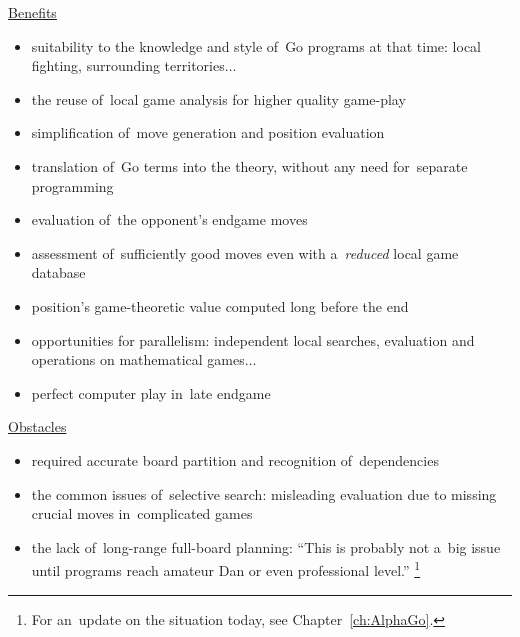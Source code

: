 \underline{Benefits}
\begin{itemize}[+]
  \item suitability to the knowledge and style of~Go programs at that time:
    local fighting, surrounding territories$\dots$
  \item the reuse of~local game analysis for higher quality game-play
  \item simplification of~move generation and position evaluation
  \item translation of~Go terms into the theory, without any need for~separate programming
  \item evaluation of~the opponent's endgame moves
  \item assessment of~sufficiently good moves even with a~\emph{reduced} local game database
  \item position's game-theoretic value computed long before the end
  \item opportunities for parallelism:
    independent local searches, evaluation and operations on mathematical games$\dots$
  \item perfect computer play in~late endgame
\end{itemize}

\underline{Obstacles}
\begin{itemize}[-]
  \item required accurate board partition and recognition of~dependencies
  \item the common issues of~selective search:
    misleading evaluation due to missing crucial moves in~complicated games
  \item the lack of~long-range full-board planning:
    ``This is probably not a~big issue until programs reach amateur Dan or even professional level.''%
    \footnote{For an~update on the situation today, see Chapter~\ref{ch:AlphaGo}.}
\end{itemize}

